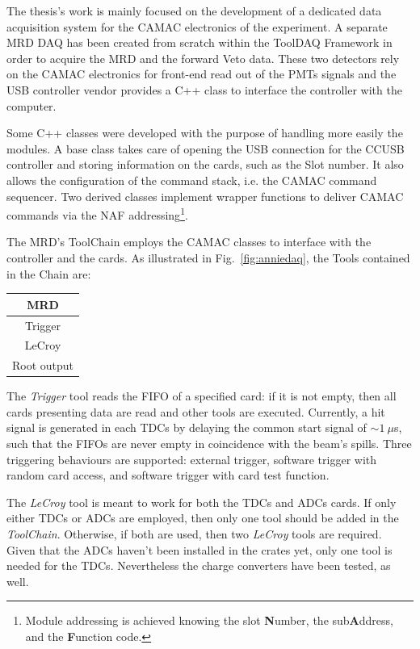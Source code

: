  The thesis's work is mainly focused on the development of a dedicated data acquisition system %
 for the CAMAC electronics of the experiment.
 A separate MRD DAQ has been created from scratch within the ToolDAQ Framework in order %
 to acquire the MRD and the forward Veto data.
 These two detectors rely on the CAMAC electronics for front-end read out of the PMTs %
 signals and the USB controller vendor provides a C++ class to interface the controller with the %
 computer.
 
 Some C++ classes were developed with the purpose of handling more easily the modules.
 A base class takes care of opening the USB connection for the CCUSB controller and storing %
 information on the cards, such as the Slot number.
 It also allows the configuration of the command stack, i.e. the CAMAC command sequencer.
 Two derived classes implement wrapper functions to deliver CAMAC commands via the %
 NAF addressing\footnote{Module addressing is achieved knowing the slot \textbf{N}umber, %
 the sub\textbf{A}ddress, and the \textbf{F}unction code.}.

 The MRD's ToolChain employs the CAMAC classes to interface with the controller and the cards.
 As illustrated in Fig.~\ref{fig:anniedaq}, the Tools contained in the Chain are:

\begin{center}
  \small
  \begin{tabular}{c}
    \toprule
    \textbf{MRD}	\\
    \midrule
    Trigger	\\
    LeCroy 	\\
    Root output	\\
    \bottomrule
  \end{tabular}
\end{center}

 The \emph{Trigger} tool reads the FIFO of a specified card: if it is not empty, then all %
 cards presenting data are read and other tools are executed.
 Currently, a hit signal is generated in each TDCs by delaying the common start %
 signal of $\sim 1~\mu$s, such that the FIFOs are never empty in coincidence with the beam's spills.
 Three triggering behaviours are supported: external trigger, software trigger with %
 random card access, and software trigger with card test function.

 The \emph{LeCroy} tool is meant to work for both the TDCs and ADCs cards.
 If only either TDCs or ADCs are employed, then only one tool should be added in the \emph{ToolChain}.
 Otherwise, if both are used, then two \emph{LeCroy} tools are required.
 Given that the ADCs haven't been installed in the crates yet, only one tool is %
 needed for the TDCs.
 Nevertheless the charge converters have been tested, as well.
 
